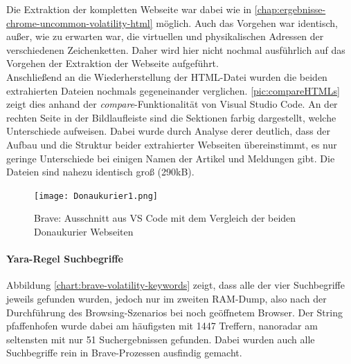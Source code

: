 Die Extraktion der kompletten Webseite war dabei wie in \autoref{chap:ergebnisse-chrome-uncommon-volatility-html} möglich. Auch das Vorgehen war identisch, außer, wie zu erwarten war, die virtuellen und physikalischen Adressen der verschiedenen Zeichenketten. Daher wird hier nicht nochmal ausführlich auf das Vorgehen der Extraktion der Webseite aufgeführt.\\
Anschließend an die Wiederherstellung der HTML-Datei wurden die beiden extrahierten Dateien nochmals gegeneinander verglichen. \autoref{pic:compareHTMLs} zeigt dies anhand der \textit{compare}-Funktionalität von Visual Studio Code. An der rechten Seite in der Bildlaufleiste sind die Sektionen farbig dargestellt, welche Unterschiede aufweisen. Dabei wurde durch Analyse derer deutlich, dass der Aufbau und die Struktur beider extrahierter Webseiten übereinstimmt, es nur geringe Unterschiede bei einigen Namen der Artikel und Meldungen gibt. Die Dateien sind nahezu identisch groß (290kB).

\begin{figure}[h!]
	\centering
	\texttt{[image: Donaukurier1.png]}
	\caption{Brave: Ausschnitt aus VS Code mit dem Vergleich der beiden Donaukurier Webseiten}
	\label{pic:compareHTMLs}
\end{figure}

\paragraph*{Yara-Regel \glqq{}Suchbegriffe\grqq{}}\label{chap:ergebnisse-brave-uncommon-locations-volatility-suchbegriffe}  
Abbildung \ref{chart:brave-volatility-keywords} zeigt, dass alle der vier Suchbegriffe jeweils gefunden wurden, jedoch nur im zweiten RAM-Dump, also nach der Durchführung des Browsing-Szenarios bei noch geöffnetem Browser. Der String \glqq{}pfaffenhofen\grqq{} wurde dabei am häufigsten mit 1447 Treffern, \glqq{}nanoradar\grqq{} am seltensten mit nur 51 Suchergebnissen gefunden. Dabei wurden auch alle Suchbegriffe rein in Brave-Prozessen ausfindig gemacht.

